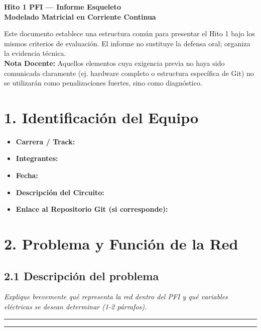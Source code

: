 \documentclass[11pt, a4paper]{article}
\begin{document}
\begin{center}
    {\LARGE \textbf{Hito 1 PFI — Informe Esqueleto}} \\[0.2cm]
    {\large \textbf{Modelado Matricial en Corriente Continua}}
\end{center}

\begin{tcolorbox}[caja_nota, title=Propósito y Equidad]
Este documento establece una estructura común para presentar el Hito 1 bajo los mismos criterios de evaluación. El informe no sustituye la defensa oral; organiza la evidencia técnica. \\
\textbf{Nota Docente:} Aquellos elementos cuya exigencia previa no haya sido comunicada claramente (ej. hardware completo o estructura específica de Git) no se utilizarán como penalizaciones fuertes, sino como diagnóstico.
\end{tcolorbox}

\section*{1. Identificación del Equipo}
\begin{itemize}[itemsep=4pt]
    \item \textbf{Carrera / Track:} \hrulefill
    \item \textbf{Integrantes:} \hrulefill
    \item \textbf{Fecha:} \hrulefill
    \item \textbf{Descripción del Circuito:} \hrulefill
    \item \textbf{Enlace al Repositorio Git (si corresponde):} \hrulefill
\end{itemize}

\section*{2. Problema y Función de la Red}
\subsection*{2.1 Descripción del problema}
\textit{Explique brevemente qué representa la red dentro del PFI y qué variables eléctricas se desean determinar (1-2 párrafos).} 

\vspace{0.4cm}
\rule{\linewidth}{0.4pt} 

\vspace{0.4cm} 
\rule{\linewidth}{0.4pt}
\end{document}
